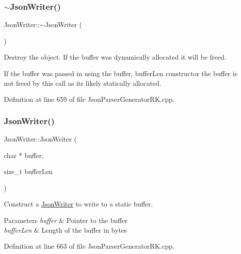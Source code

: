 \subsubsection{\texorpdfstring{$\sim$\+Json\+Writer()}{~JsonWriter()}}
{\footnotesize\ttfamily Json\+Writer\+::$\sim$\+Json\+Writer (\begin{DoxyParamCaption}{ }\end{DoxyParamCaption})\hspace{0.3cm}{\ttfamily [virtual]}}



Destroy the object. If the buffer was dynamically allocated it will be freed. 

If the buffer was passed in using the buffer, buffer\+Len constructor the buffer is not freed by this call as it\textquotesingle{}s likely statically allocated. 

Definition at line 659 of file Json\+Parser\+Generator\+R\+K.\+cpp.

\mbox{\label{class_json_writer_ae97b42591255aece772a046eb098fd77}} 
\subsubsection{\texorpdfstring{Json\+Writer()}{JsonWriter()}\hspace{0.1cm}{\footnotesize\ttfamily [2/2]}}
{\footnotesize\ttfamily Json\+Writer\+::\+Json\+Writer (\begin{DoxyParamCaption}\item[{char $\ast$}]{buffer,  }\item[{size\+\_\+t}]{buffer\+Len }\end{DoxyParamCaption})}



Construct a \hyperlink{class_json_writer}{Json\+Writer} to write to a static buffer. 


\begin{DoxyParams}{Parameters}
{\em buffer} & Pointer to the buffer\\
\hline
{\em buffer\+Len} & Length of the buffer in bytes \\
\hline
\end{DoxyParams}


Definition at line 663 of file Json\+Parser\+Generator\+R\+K.\+cpp.



